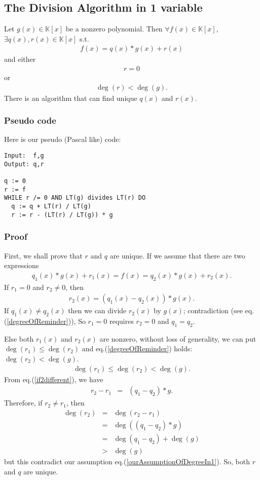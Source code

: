 \documentclass[11pt]{book}
\begin{document}
\subsection{The Division Algorithm in 1 variable}
\label{DivisionAlgorithmIn1}
Let $g(x) \in \mathbb{K}[x]$ be a nonzero polynomial.
Then $\forall f(x) \in \mathbb{K}[x]$, $\exists q(x),r(x) \in \mathbb{K}[x]$ s.t.
\begin{eqnarray}
f(x) = q(x)*g(x) + r(x)
\end{eqnarray}
and either
\begin{eqnarray}
r = 0
\end{eqnarray}
or
\begin{eqnarray}
\label{degreeOfReminder}
\deg(r) < \deg(g).
\end{eqnarray}
There is an algorithm that can find unique $q(x)$ and $r(x)$.

\subsubsection{Pseudo code}
Here is our pseudo (Pascal like) code:
\begin{verbatim}
Input:  f,g
Output: q,r

q := 0
r := f
WHILE r /= 0 AND LT(g) divides LT(r) DO
  q := q + LT(r) / LT(g)
  r := r - (LT(r) / LT(g)) * g
\end{verbatim}

\subsubsection{Proof}
First, we shall prove that $r$ and $q$ are unique.
If we assume that there are two expressions
\begin{eqnarray}
\label{if2different}
q_1(x)*g(x) + r_1(x) = f(x) = q_2(x)*g(x) + r_2(x).
\end{eqnarray}
If $r_1 = 0$ and $r_2 \neq 0$, then
\begin{eqnarray}
r_2(x) = \left(q_1(x) - q_2(x) \right)*g(x).
\end{eqnarray}
If $q_1(x) \neq q_2(x)$ then we can divide $r_2(x)$ by $g(x)$; contradiction (see eq.(\ref{degreeOfReminder})),
So $r_1 =0$ requires $r_2=0$ and $q_1=q_2$.

Else both $r_1(x)$ and $r_2(x)$ are nonzero, without loss of generality, we can put $\deg(r_1) \leq \deg(r_2)$ and eq.(\ref{degreeOfReminder}) holds: $\deg(r_2)< \deg(g)$.
\begin{eqnarray}
\label{ourAssumptionOfDegreeIn1}
\deg(r_1) \leq \deg(r_2)< \deg(g).
\end{eqnarray}
From eq.(\ref{if2different}), we have
\begin{eqnarray}
r_2 - r_1 &=& (q_1 - q_2)*g.
\end{eqnarray}
Therefore, if $r_2 \neq r_1$, then
\begin{eqnarray}
\deg(r_2) &=& \deg(r_2 - r_1) \\
&=& \deg\left( (q_1 - q_2)*g \right) \\
&=& \deg(q_1 - q_2) + \deg(g) \\
&>& \deg(g)
\end{eqnarray}
but this contradict our assumption eq.(\ref{ourAssumptionOfDegreeIn1}).
So, both $r$ and $q$ are unique.
\end{document}
